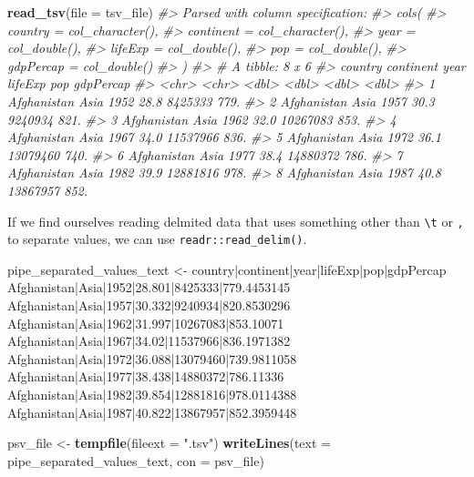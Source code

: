 \documentclass[
]{report}
\newenvironment{Shaded}{\begin{snugshade}}{\end{snugshade}}
\newcommand{\CommentTok}[1]{\textcolor[rgb]{0.56,0.35,0.01}{\textit{#1}}}
\newcommand{\DataTypeTok}[1]{\textcolor[rgb]{0.13,0.29,0.53}{#1}}
\newcommand{\KeywordTok}[1]{\textcolor[rgb]{0.13,0.29,0.53}{\textbf{#1}}}
\newcommand{\NormalTok}[1]{#1}
\newcommand{\StringTok}[1]{\textcolor[rgb]{0.31,0.60,0.02}{#1}}
\begin{document}
\begin{Shaded}
\begin{Highlighting}[]
\KeywordTok{read\_tsv}\NormalTok{(}\DataTypeTok{file =}\NormalTok{ tsv\_file)}
\CommentTok{\#\textgreater{} Parsed with column specification:}
\CommentTok{\#\textgreater{} cols(}
\CommentTok{\#\textgreater{}   country = col\_character(),}
\CommentTok{\#\textgreater{}   continent = col\_character(),}
\CommentTok{\#\textgreater{}   year = col\_double(),}
\CommentTok{\#\textgreater{}   lifeExp = col\_double(),}
\CommentTok{\#\textgreater{}   pop = col\_double(),}
\CommentTok{\#\textgreater{}   gdpPercap = col\_double()}
\CommentTok{\#\textgreater{} )}
\CommentTok{\#\textgreater{} \# A tibble: 8 x 6}
\CommentTok{\#\textgreater{}   country     continent  year lifeExp      pop gdpPercap}
\CommentTok{\#\textgreater{}   \textless{}chr\textgreater{}       \textless{}chr\textgreater{}     \textless{}dbl\textgreater{}   \textless{}dbl\textgreater{}    \textless{}dbl\textgreater{}     \textless{}dbl\textgreater{}}
\CommentTok{\#\textgreater{} 1 Afghanistan Asia       1952    28.8  8425333      779.}
\CommentTok{\#\textgreater{} 2 Afghanistan Asia       1957    30.3  9240934      821.}
\CommentTok{\#\textgreater{} 3 Afghanistan Asia       1962    32.0 10267083      853.}
\CommentTok{\#\textgreater{} 4 Afghanistan Asia       1967    34.0 11537966      836.}
\CommentTok{\#\textgreater{} 5 Afghanistan Asia       1972    36.1 13079460      740.}
\CommentTok{\#\textgreater{} 6 Afghanistan Asia       1977    38.4 14880372      786.}
\CommentTok{\#\textgreater{} 7 Afghanistan Asia       1982    39.9 12881816      978.}
\CommentTok{\#\textgreater{} 8 Afghanistan Asia       1987    40.8 13867957      852.}
\end{Highlighting}
\end{Shaded}

If we find ourselves reading delmited data that uses something other than \texttt{\textbackslash{}t} or \texttt{,} to separate values, we can use \texttt{readr::read\_delim()}.

\begin{Shaded}
\begin{Highlighting}[]
\NormalTok{pipe\_separated\_values\_text \textless{}{-}}\StringTok{ }
\StringTok{\textquotesingle{}country|continent|year|lifeExp|pop|gdpPercap     }
\StringTok{Afghanistan|Asia|1952|28.801|8425333|779.4453145}
\StringTok{Afghanistan|Asia|1957|30.332|9240934|820.8530296}
\StringTok{Afghanistan|Asia|1962|31.997|10267083|853.10071}
\StringTok{Afghanistan|Asia|1967|34.02|11537966|836.1971382}
\StringTok{Afghanistan|Asia|1972|36.088|13079460|739.9811058}
\StringTok{Afghanistan|Asia|1977|38.438|14880372|786.11336}
\StringTok{Afghanistan|Asia|1982|39.854|12881816|978.0114388}
\StringTok{Afghanistan|Asia|1987|40.822|13867957|852.3959448\textquotesingle{}}

\NormalTok{psv\_file \textless{}{-}}\StringTok{ }\KeywordTok{tempfile}\NormalTok{(}\DataTypeTok{fileext =} \StringTok{".tsv"}\NormalTok{)}
\KeywordTok{writeLines}\NormalTok{(}\DataTypeTok{text =}\NormalTok{ pipe\_separated\_values\_text, }\DataTypeTok{con =}\NormalTok{ psv\_file)}
\end{Highlighting}
\end{Shaded}
\end{document}
